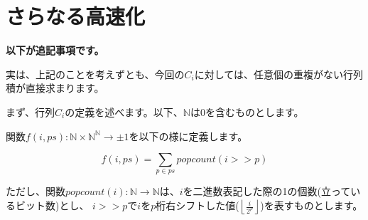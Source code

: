 \documentclass[a4paper, 10pt, dvipdfmx]{jlreq}
\begin{document}
\section{さらなる高速化}

\textbf{以下が追記事項です。}

実は、上記のことを考えずとも、今回の$C_i$に対しては、任意個の重複がない行列積が直接求まります。

まず、行列$C_i$の定義を述べます。以下、$\mathbb{N}$は$0$を含むものとします。

関数$f(i,ps) : \mathbb{N} \times \mathbb{N}^\mathbb{N} \to \pm 1$を以下の様に定義します。

$$
    f(i,ps)=\sum_{p \in ps}{popcount\left(i>>p\right)}
$$

ただし、関数$popcount(i): \mathbb{N} \to \mathbb{N}$は、$i$を二進数表記した際の1の個数(立っているビット数)とし、
$i>>p$で$i$を$p$桁右シフトした値($\left\lfloor\frac{i}{2^p}\right\rfloor$)を表すものとします。
\end{document}
